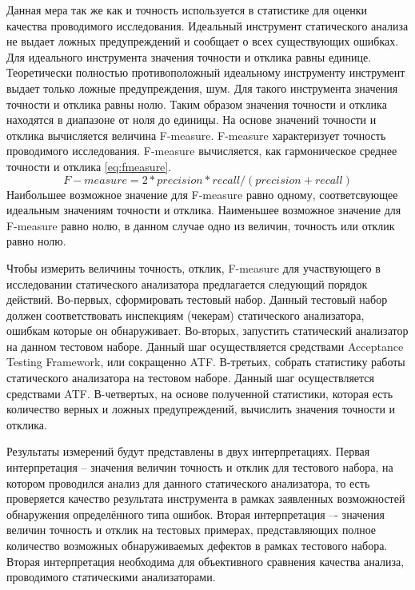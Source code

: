 Данная мера так же как и точность используется в статистике для оценки качества проводимого
исследования. Идеальный инструмент статического анализа не выдает ложных
предупреждений и сообщает о всех существующих ошибках. Для идеального инструмента значения точности и отклика равны единице. Теоретически полностью
противоположный идеальному инструменту инструмент выдает только ложные
предупреждения, шум. Для такого инструмента значения точности и отклика равны
нолю. Таким образом значения точности и отклика находятся в диапазоне от ноля до
единицы. На основе значений точности и отклика вычисляется величина F-measure.
F-measure характеризует точность проводимого исследования. 
F-measure вычисляется, как гармоническое среднее точности и отклика \eqref{eq:fmeasure}. 
\begin{equation}\label{eq:fmeasure}
F-measure = 2 * precision * recall / (precision + recall)
\end{equation}
Наибольшее возможное значение для F-measure равно одному, соответсвующее идеальным значениям точности и отклика.
Наименьшее возможное значение для F-measure равно нолю, в данном случае одно из величин, точность или отклик равно нолю.

Чтобы измерить величины точность, отклик, F-measure для участвующего в исследовании статического анализатора
предлагается следующий порядок действий. Во-первых, сформировать тестовый набор. Данный тестовый набор должен соответствовать инспекциям (чекерам) статического
анализатора, ошибкам которые он обнаруживает. Во-вторых, запустить статический анализатор на данном тестовом наборе. Данный шаг осуществляется
средствами Acceptance Testing Framework, или сокращенно ATF. В-третьих, собрать статистику работы статического анализатора
на тестовом наборе. Данный шаг осуществляется средствами ATF. В-четвертых,
на основе полученной статистики, которая есть количество верных и ложных
предупреждений, вычислить значения точности и отклика. 

Результаты измерений будут
представлены в двух интерпретациях. Первая интерпретация -- значения величин
точность и отклик для тестового набора, на котором проводился анализ для данного статического анализатора, то есть проверяется качество результата инструмента в рамках заявленных возможностей обнаружения определённого типа ошибок. Вторая интерпретация –- значения величин 
точность и отклик на тестовых примерах, представляющих полное количество возможных обнаруживаемых дефектов в рамках тестового набора. Вторая интерпретация необходима для объективного сравнения качества
анализа, проводимого статическими анализаторами.

